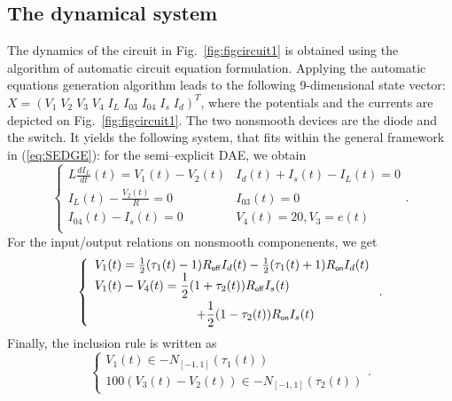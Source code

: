 \subsection{The dynamical system}
\label{section31}
The dynamics of the circuit in Fig.~\ref{fig:figcircuit1} is obtained using the algorithm of automatic circuit equation formulation. Applying the automatic equations generation algorithm leads to the following 9-dimensional state vector: $X=(V_1\;V_2\;V_3\;V_4\;I_L\;I_{03}\;I_{04}\;I_s\;I_d)^{T}$, where the potentials and the currents are depicted on Fig.~\ref{fig:figcircuit1}.  The two nonsmooth devices are the diode and the switch. It yields the following system, that fits within the general framework in (\ref{eq:SEDGE}): for the semi--explicit DAE, we obtain
\begin{equation}
  \label{eq:72}
 \left\{ 
    \begin{array}{lll}
      L  \frac{dI_L}{dt}(t) = V_1(t)-V_2(t) &
      I_d(t)+I_s(t)-I_L(t)=0 \\
      I_L(t)-\frac{V_2(t)}{R}=0&
      I_{03}(t)=0\\
      I_{04}(t)-I_{s}(t)=0&
      V_4(t)=20 ,
      V_3=e(t)\\
\end{array}\right. .
\end{equation}
For the input/output relations on nonsmooth componenents, we get
\begin{equation}
 \left\{ \begin{array}{l}
V_{1}(t)=\frac{1}{2}(\tau_{1}(t)-1)R_\off I_{d}(t)-\frac{1}{2}(\tau_{1}(t)+1) R_\on I_{d}(t) \\ 
\begin{split}
 V_{1}(t)-V_{4}(t)= \frac{1}{2}(1+\tau_{2}(t)) R_\off I_{s}(t)
  \quad\quad \\+\frac{1}{2}(1-\tau_{2}(t)) R_\on I_{s}(t)
\end{split}
  \end{array} \right. .
\end{equation}
 Finally, the inclusion rule is written as
\begin{equation}
  \left\{\begin{array}{l}
      V_{1}(t) \in - N_{[-1,1]}(\tau_{1}(t)) \\   100(V_{3}(t)-V_{2}(t)) \in -N_{[-1,1]}(\tau_{2}(t))
    \end{array} 
\right. .
\end{equation}

